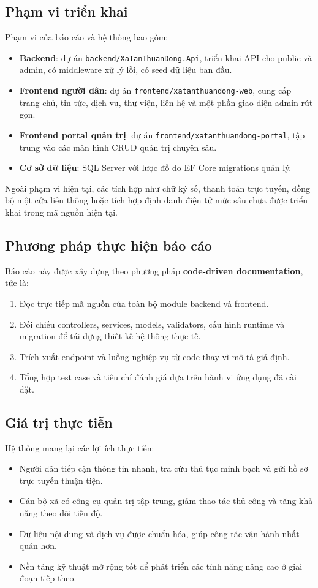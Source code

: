 \documentclass[12pt,a4paper]{article}
\begin{document}
\subsection{Phạm vi triển khai}
Phạm vi của báo cáo và hệ thống bao gồm:
\begin{itemize}[leftmargin=1.1cm]
  \item \textbf{Backend}: dự án \texttt{backend/XaTanThuanDong.Api}, triển khai API cho public và admin, có middleware xử lý lỗi, có seed dữ liệu ban đầu.
  \item \textbf{Frontend người dân}: dự án \texttt{frontend/xatanthuandong-web}, cung cấp trang chủ, tin tức, dịch vụ, thư viện, liên hệ và một phần giao diện admin rút gọn.
  \item \textbf{Frontend portal quản trị}: dự án \texttt{frontend/xatanthuandong-portal}, tập trung vào các màn hình CRUD quản trị chuyên sâu.
  \item \textbf{Cơ sở dữ liệu}: SQL Server với lược đồ do EF Core migrations quản lý.
\end{itemize}

Ngoài phạm vi hiện tại, các tích hợp như chữ ký số, thanh toán trực tuyến, đồng bộ một cửa liên thông hoặc tích hợp định danh điện tử mức sâu chưa được triển khai trong mã nguồn hiện tại.

\subsection{Phương pháp thực hiện báo cáo}
Báo cáo này được xây dựng theo phương pháp \textbf{code-driven documentation}, tức là:
\begin{enumerate}[leftmargin=1.1cm]
  \item Đọc trực tiếp mã nguồn của toàn bộ module backend và frontend.
  \item Đối chiếu controllers, services, models, validators, cấu hình runtime và migration để tái dựng thiết kế hệ thống thực tế.
  \item Trích xuất endpoint và luồng nghiệp vụ từ code thay vì mô tả giả định.
  \item Tổng hợp test case và tiêu chí đánh giá dựa trên hành vi ứng dụng đã cài đặt.
\end{enumerate}

\subsection{Giá trị thực tiễn}
Hệ thống mang lại các lợi ích thực tiễn:
\begin{itemize}[leftmargin=1.1cm]
  \item Người dân tiếp cận thông tin nhanh, tra cứu thủ tục minh bạch và gửi hồ sơ trực tuyến thuận tiện.
  \item Cán bộ xã có công cụ quản trị tập trung, giảm thao tác thủ công và tăng khả năng theo dõi tiến độ.
  \item Dữ liệu nội dung và dịch vụ được chuẩn hóa, giúp công tác vận hành nhất quán hơn.
  \item Nền tảng kỹ thuật mở rộng tốt để phát triển các tính năng nâng cao ở giai đoạn tiếp theo.
\end{itemize}
\end{document}
